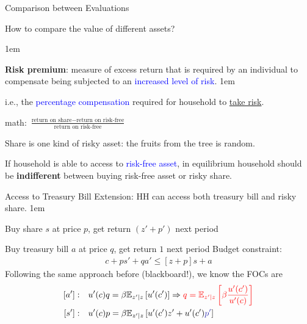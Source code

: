 \documentclass[handout, 11pt,aspectratio=43,usenames,dvipsnames]{beamer}
\newcommand{\red}[1]{\textcolor{red}{#1}}
\newcommand{\blue}[1]{\textcolor{blue}{#1}}
\let\olditemize=\itemize
\let\endolditemize=\enditemize
\renewenvironment{itemize}{\olditemize \itemsep1em}{\endolditemize}
\theoremstyle{definition}
\begin{document}
\begin{frame}{Comparison between Evaluations}
\label{slide:Comparison_between_Evaluations}
    \begin{center}
        How to compare the value of different assets?
    \end{center}

    \begin{itemize}
        \item \textbf{Risk premium}: measure of excess return that is required by an individual to compensate being subjected to an \blue{increased level of risk}.
        \begin{itemize}
            \item i.e., the \blue{percentage compensation} required for household to \underline{take risk}.
            \item math: $ \displaystyle \frac{\text{return on share} - \text{return on risk-free}}{\text{return on risk-free}} $
        \end{itemize}
        \item Share is one kind of risky asset: the fruits from the tree is random.
        \item If household is able to access to \blue{risk-free asset}, in equilibrium household should be \textbf{indifferent} between buying risk-free asset or risky share.
    \end{itemize}
\end{frame}

\begin{frame}{Access to Treasury Bill}
\label{slide:Access_to_Treasury_Bill}
    Extension: HH can access both treasury bill and risky share.
    \begin{itemize}
        \item Buy share $ s $ at price $ p $, get return $ (z'+p') $ next period
        \item Buy treasury bill $ a $ at price $ q $, get return $ 1 $ next period
    \end{itemize}
    \medskip
    Budget constraint:
    \begin{align}
        c + p s' + q a' \le [z+p]s + a
    \end{align}
    Following the same approach before (blackboard!), we know the FOCs are
    \begin{align}
        \label{eq:riskFreeSDF}
        [a']: \quad
            & u'(c) q = \beta \mathbb{E}_{z'|z} \left[
                u'(c')
            \right] \Rightarrow \red{q = \mathbb{E}_{z'|z}\left[
                \beta \frac{u'(c')}{u'(c)}
            \right]}
        \\
        [s']: \quad
            &  u'(c) p = \beta \mathbb{E}_{z'|z} \left[
                u'(c') z' + u'(c') \blue{p'}
            \right]
    \end{align}

\end{frame}
\end{document}
